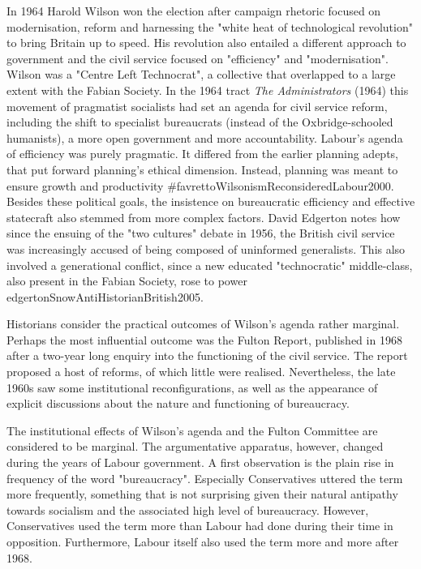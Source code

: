 \documentclass[
]{article}
\begin{document}
In 1964 Harold Wilson won the election after campaign rhetoric focused
on modernisation, reform and harnessing the "white heat of technological
revolution" to bring Britain up to speed. His revolution also entailed a
different approach to government and the civil service focused on
"efficiency" and "modernisation". Wilson was a "Centre Left Technocrat",
a collective that overlapped to a large extent with the Fabian Society.
In the 1964 tract \emph{The Administrators} (1964) this movement of
pragmatist socialists had set an agenda for civil service reform,
including the shift to specialist bureaucrats (instead of the
Oxbridge-schooled humanists), a more open government and more
accountability. Labour's agenda of efficiency was purely pragmatic. It
differed from the earlier planning adepts, that put forward planning's
ethical dimension. Instead, planning was meant to ensure growth and
productivity \#favrettoWilsonismReconsideredLabour2000. Besides these
political goals, the insistence on bureaucratic efficiency and effective
statecraft also stemmed from more complex factors. David Edgerton notes
how since the ensuing of the "two cultures" debate in 1956, the British
civil service was increasingly accused of being composed of uninformed
generalists. This also involved a generational conflict, since a new
educated "technocratic" middle-class, also present in the Fabian
Society, rose to power edgertonSnowAntiHistorianBritish2005.

Historians consider the practical outcomes of Wilson's agenda rather
marginal. Perhaps the most influential outcome was the Fulton Report,
published in 1968 after a two-year long enquiry into the functioning of
the civil service. The report proposed a host of reforms, of which
little were realised. Nevertheless, the late 1960s saw some
institutional reconfigurations, as well as the appearance of explicit
discussions about the nature and functioning of bureaucracy.

The institutional effects of Wilson's agenda and the Fulton Committee
are considered to be marginal. The argumentative apparatus, however,
changed during the years of Labour government. A first observation is
the plain rise in frequency of the word "bureaucracy". Especially
Conservatives uttered the term more frequently, something that is not
surprising given their natural antipathy towards socialism and the
associated high level of bureaucracy. However, Conservatives used the
term more than Labour had done during their time in opposition.
Furthermore, Labour itself also used the term more and more after 1968.
\end{document}
